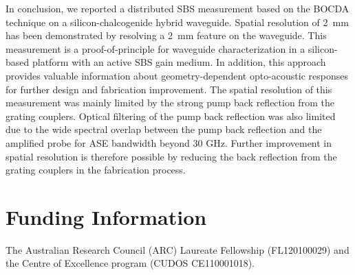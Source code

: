 \documentclass[superscriptaddress, nofootinbib, twocolumn, amsmath,amssymb, aps, pra, notitlepage, longbibliography]{revtex4-1}
\begin{document}
In conclusion, we reported a distributed SBS measurement based on the BOCDA technique on a silicon-chalcogenide hybrid waveguide. Spatial resolution of \SI{2}{\mm} has been demonstrated by resolving a \SI{2}{\mm} feature on the waveguide. This measurement is a proof-of-principle for waveguide characterization in a silicon-based platform with an active SBS gain medium. In addition, this approach provides valuable information about geometry-dependent opto-acoustic responses for further design and fabrication improvement. 
The spatial resolution of this measurement was mainly limited by the strong pump back reflection from the grating couplers. Optical filtering of the pump back reflection was also limited due to the wide spectral overlap between the pump back reflection and the amplified probe for ASE bandwidth beyond 30 GHz. Further improvement in spatial resolution is therefore possible by reducing the back reflection from the grating couplers in the fabrication process.


\section*{Funding Information}

The Australian Research Council (ARC) Laureate Fellowship (FL120100029) and the Centre of Excellence program (CUDOS CE110001018).







 
\end{document}
